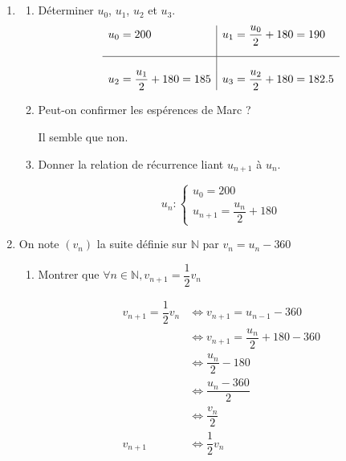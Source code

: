 \documentclass[10pt]{scrartcl}
\begin{document}
\begin{enumerate}[label=\textbf{\arabic*{}.}]
    \item\subsection*{}

    \begin{enumerate}[label=\textbf{\alph*{})}]
        \item Déterminer $u_0$, $u_1$, $u_2$ et $u_3$.
        $$
            \begin{array}{l|l}
                u_0 = 200 & u_1=\dfrac{u_0}{2} + 180 = 190\\[3ex]
                \hline\\
                u_2 = \dfrac{u_1}{2} + 180 = 185 & u_3 = \dfrac{u_2}{2} + 180 = 182.5
            \end{array}
        $$

        \item Peut-on confirmer les espérences de Marc ?

        \begin{center}
            Il semble que non.
        \end{center}

        \item Donner la relation de récurrence liant $u_{n+1}$ à $u_n$.

        $$
            u_n : 
            \left\{
            \begin{array}
                {l}u_0 = 200 \\ u_{n+1} = \dfrac{u_n}{2} + 180
            \end{array}
            \right.
        $$
    \end{enumerate}

    \item On note $(v_n)$ la suite définie sur $\mathbb{N}$ par $v_n=u_n - 360$

    \begin{enumerate}[label=\textbf{\alph*)}]
        \item Montrer que $\forall n\in\mathbb{N}, v_{n+1} = \dfrac{1}{2}v_n$

        $$
            \begin{array}{rl}
                v_{n+1} = \dfrac{1}{2}v_n & \iff{} v_{n+1} = u_{n-1} - 360\\[3ex]
                 & \iff{} v_{n+1} = \dfrac{u_n}{2}+180-360\\[3ex]
                 & \iff{} \dfrac{u_n}{2} - 180\\[3ex]
                 & \iff{} \dfrac{u_n - 360}{2}\\[3ex]
                 & \iff{} \dfrac{v_n}{2}\\[3ex]
                v_{n+1} & \iff{} \dfrac{1}{2}v_n\\
            \end{array}
        $$
        


\end{enumerate}
\end{enumerate}
\end{document}
